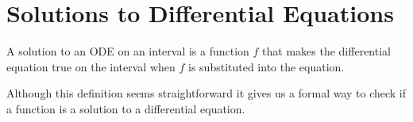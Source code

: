 \section{Solutions to Differential Equations}
\begin{definition}
	A solution to an ODE on an interval is a function $f$ that makes the differential equation true on the interval when $f$ is substituted into the equation.
\end{definition}
\noindent
Although this definition seems straightforward it gives us a formal way to check if a function is a solution to a differential equation.

\ifodd{}\fi